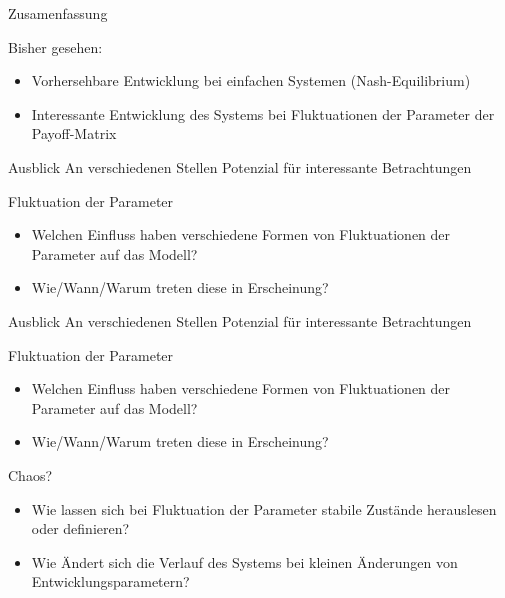 \documentclass{beamer}
\begin{document}
\begin{frame}{Zusamenfassung}
    \begin{block}{Bisher gesehen:}
    \begin{itemize}
        \item Vorhersehbare Entwicklung bei einfachen Systemen (Nash-Equilibrium)
        \item Interessante Entwicklung des Systems bei Fluktuationen der Parameter der Payoff-Matrix
    \end{itemize}
    \end{block}
    
\end{frame}

\begin{frame}{Ausblick}
    An verschiedenen Stellen Potenzial für interessante Betrachtungen
    \begin{block}{Fluktuation der Parameter}
    
    \begin{itemize}
        \item Welchen Einfluss haben verschiedene Formen von Fluktuationen der Parameter auf das Modell?
        \item Wie/Wann/Warum treten diese in Erscheinung?
    \end{itemize}
    \end{block}
    
\end{frame}

\begin{frame}{Ausblick}
    An verschiedenen Stellen Potenzial für interessante Betrachtungen
    \begin{block}{Fluktuation der Parameter}
    
    \begin{itemize}
        \item Welchen Einfluss haben verschiedene Formen von Fluktuationen der Parameter auf das Modell?
        \item Wie/Wann/Warum treten diese in Erscheinung?
    \end{itemize}
    \end{block}
    
    \begin{block}{Chaos?}
    \begin{itemize}
        \item Wie lassen sich bei Fluktuation der Parameter stabile Zustände herauslesen oder definieren? 
        \item Wie Ändert sich die Verlauf des Systems bei kleinen Änderungen von Entwicklungsparametern?
    \end{itemize}
    \end{block}
\end{frame}
\end{document}
